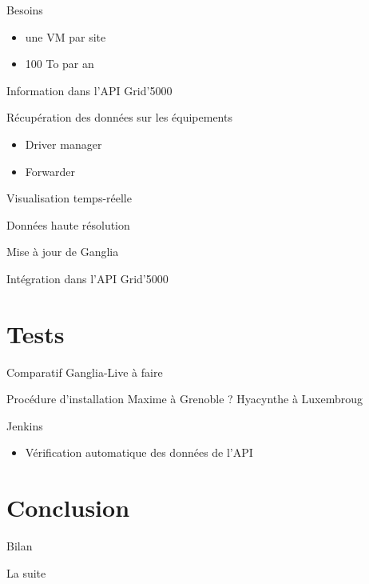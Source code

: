 \documentclass{beamer}
\begin{document}
\begin{frame}{Besoins}
\begin{itemize}
  \item une VM par site
  \item 100 To par an
\end{itemize}

Information dans l'API Grid'5000
\end{frame}

\begin{frame}{Récupération des données sur les équipements}

\begin{itemize}
  \item Driver manager
  \item Forwarder
\end{itemize}
\end{frame}

\begin{frame}{Visualisation temps-réelle}

\end{frame}


\begin{frame}{Données haute résolution}

\end{frame}

\begin{frame}{Mise à jour de Ganglia}

\end{frame}

\begin{frame}{Intégration dans l'API Grid'5000}

\end{frame}



\section{Tests}

\begin{frame}{Comparatif Ganglia-Live}
à faire
\end{frame}

\begin{frame}{Procédure d'installation}
Maxime à Grenoble ?
Hyacynthe à Luxembroug
\end{frame}



\begin{frame}{Jenkins}
\begin{itemize}
  \item Vérification automatique des données de l'API
\end{itemize}
\end{frame}


\section*{Conclusion}

\begin{frame}{Bilan}

\end{frame}

\begin{frame}{La suite}


\end{frame}
\end{document}
